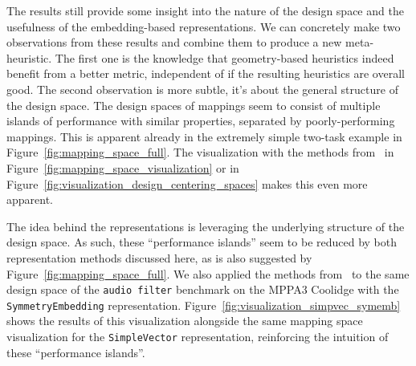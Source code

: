 The results still provide some insight into the nature of the design space and the usefulness of the embedding-based representations.
We can concretely make two observations from these results and combine them to produce a new meta-heuristic.
The first one is the knowledge that geometry-based heuristics indeed benefit from a better metric, independent of if the resulting heuristics are overall good.
The second observation is more subtle, it's about the general structure of the design space. 
The design spaces of mappings seem to consist of multiple islands of performance with similar properties, separated by poorly-performing mappings.
This is apparent already in the extremely simple two-task example in Figure~\ref{fig:mapping_space_full}.
The visualization with the methods from~\cite{visualloss} in Figure~\ref{fig:mapping_space_visualization} or in Figure~\ref{fig:visualization_design_centering_spaces} makes this even more apparent.

The idea behind the representations is leveraging the underlying structure of the design space.
As such, these ``performance islands'' seem to be reduced by both representation methods discussed here, as is also suggested by Figure~\ref{fig:mapping_space_full}.
We also applied the methods from~\cite{visualloss} to the same design space of the \texttt{audio filter} benchmark on the MPPA3 Coolidge with the \texttt{SymmetryEmbedding} representation.
Figure~\ref{fig:visualization_simpvec_symemb} shows the results of this visualization alongside the same mapping space visualization for the \texttt{SimpleVector} representation, reinforcing the intuition of these ``performance islands''.


